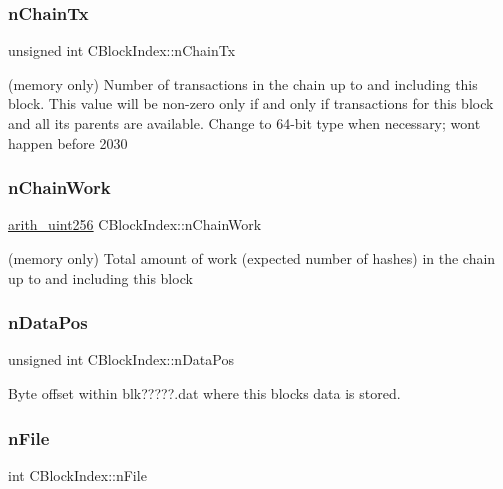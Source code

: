 \subsubsection{\texorpdfstring{n\+Chain\+Tx}{nChainTx}}
{\footnotesize\ttfamily unsigned int C\+Block\+Index\+::n\+Chain\+Tx}

(memory only) Number of transactions in the chain up to and including this block. This value will be non-\/zero only if and only if transactions for this block and all its parents are available. Change to 64-\/bit type when necessary; won\textquotesingle{}t happen before 2030 \mbox{\label{class_c_block_index_a31e65c1f491d438dfdcd8d92bdfa73a1}} 
\subsubsection{\texorpdfstring{n\+Chain\+Work}{nChainWork}}
{\footnotesize\ttfamily \mbox{\hyperlink{classarith__uint256}{arith\+\_\+uint256}} C\+Block\+Index\+::n\+Chain\+Work}



(memory only) Total amount of work (expected number of hashes) in the chain up to and including this block 

\mbox{\label{class_c_block_index_af164283dfb2d62ac44be8d10446bce4a}} 
\subsubsection{\texorpdfstring{n\+Data\+Pos}{nDataPos}}
{\footnotesize\ttfamily unsigned int C\+Block\+Index\+::n\+Data\+Pos}



Byte offset within blk?????.dat where this block\textquotesingle{}s data is stored. 

\mbox{\label{class_c_block_index_a3653cb1e1bc3fa3fcdf1ed50ff93b50a}} 
\subsubsection{\texorpdfstring{n\+File}{nFile}}
{\footnotesize\ttfamily int C\+Block\+Index\+::n\+File}



